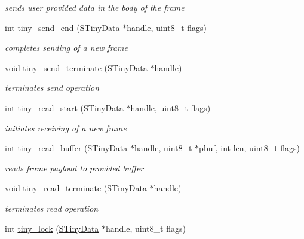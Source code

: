 \begin{DoxyCompactItemize}
\begin{DoxyCompactList}\small\item\em sends user provided data in the body of the frame \end{DoxyCompactList}\item 
int \hyperlink{group__ADVANCED__API_ga2e85c7e9efb0bbe9c6adfd923ec7c73c}{tiny\+\_\+send\+\_\+end} (\hyperlink{structSTinyData}{S\+Tiny\+Data} $\ast$handle, uint8\+\_\+t flags)
\begin{DoxyCompactList}\small\item\em completes sending of a new frame \end{DoxyCompactList}\item 
void \hyperlink{group__ADVANCED__API_ga73c9f1cfb0948bd559d3704749db540b}{tiny\+\_\+send\+\_\+terminate} (\hyperlink{structSTinyData}{S\+Tiny\+Data} $\ast$handle)
\begin{DoxyCompactList}\small\item\em terminates send operation \end{DoxyCompactList}\item 
int \hyperlink{group__ADVANCED__API_ga2f0547115de5b96a828d79f5491d22fa}{tiny\+\_\+read\+\_\+start} (\hyperlink{structSTinyData}{S\+Tiny\+Data} $\ast$handle, uint8\+\_\+t flags)
\begin{DoxyCompactList}\small\item\em initiates receiving of a new frame \end{DoxyCompactList}\item 
int \hyperlink{group__ADVANCED__API_gade4e07eb12b8e32e6dd0c7b9757e8f39}{tiny\+\_\+read\+\_\+buffer} (\hyperlink{structSTinyData}{S\+Tiny\+Data} $\ast$handle, uint8\+\_\+t $\ast$pbuf, int len, uint8\+\_\+t flags)
\begin{DoxyCompactList}\small\item\em reads frame payload to provided buffer \end{DoxyCompactList}\item 
void \hyperlink{group__ADVANCED__API_gaab48caab81a46d74fb52f2afb2649b61}{tiny\+\_\+read\+\_\+terminate} (\hyperlink{structSTinyData}{S\+Tiny\+Data} $\ast$handle)
\begin{DoxyCompactList}\small\item\em terminates read operation \end{DoxyCompactList}\item 
int \hyperlink{group__ADVANCED__API_gac318682c20279f9f20ffc6f636a7f1c9}{tiny\+\_\+lock} (\hyperlink{structSTinyData}{S\+Tiny\+Data} $\ast$handle, uint8\+\_\+t flags)

\end{DoxyCompactItemize}
